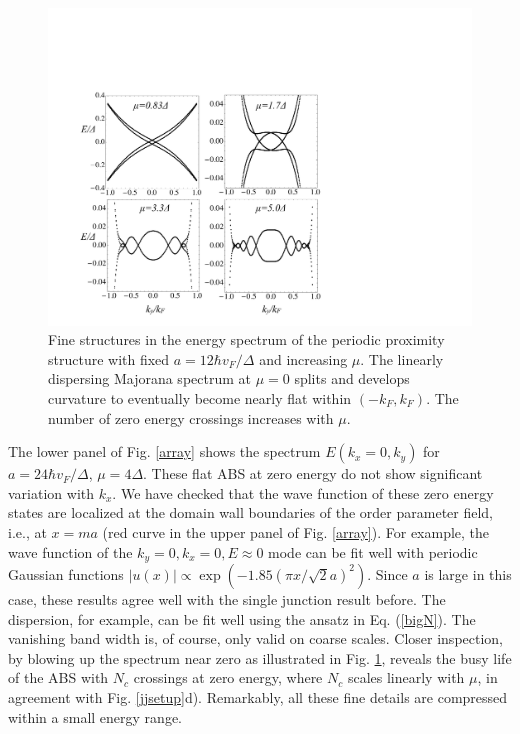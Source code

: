 \begin{figure}[h]
\includegraphics[width=\textwidth]{include/fig4.pdf}
\caption{Fine structures in the energy spectrum of the periodic proximity structure with fixed $a=12
\hbar v_F/\Delta$
and increasing $\mu$. The linearly dispersing Majorana spectrum at $\mu=0$ splits and develops
curvature to eventually become nearly flat within $(-k_F,k_F)$. The number of zero energy
crossings increases with $\mu$.
}\label{comp}
\end{figure}

The lower panel of Fig. \ref{array} shows the spectrum $E(k_x=0,k_y)$ for $a=24\hbar v_F/\Delta$, $\mu=4\Delta$. 
These flat ABS at zero energy do not show significant
variation with $k_x$. We have checked that the wave function of these zero energy states
are localized at the domain wall boundaries of the order parameter field, i.e., at $x=ma$ (red
curve in the upper panel of Fig. \ref{array}). For example, the wave function of the $k_y=0,k_x=0,E\approx 0$ 
mode can be fit well with periodic Gaussian functions $|u(x)|\propto \exp(-{1.85 (\pi x/\sqrt{2}a)^2})$.
Since $a$ is large in this case, these results agree well with the single junction result before.
The dispersion, for example, can be fit well using the ansatz in Eq. (\ref{bigN}).
The vanishing band width is, of course, only valid on coarse scales. Closer inspection, by blowing up the spectrum near zero as
illustrated in Fig. \ref{comp}, reveals the busy life of the ABS with $N_c$ crossings at zero energy,
where $N_c$ scales linearly with $\mu$, in agreement with Fig. \ref{jjsetup}d).
Remarkably, all these fine details are compressed within a small energy range. 

